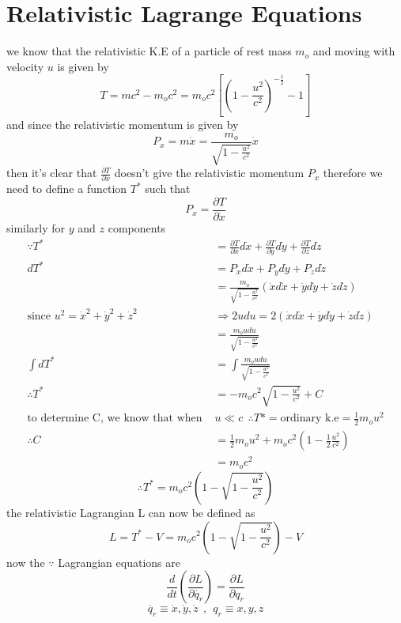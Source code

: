 \documentclass{article}
\begin{document}
\section{Relativistic Lagrange Equations}
we know that the relativistic K.E of a particle of rest mass $m_o$ and moving with velocity $u$ is given by 
\[
    T = mc^2 - m_o c^2 = m_o c^2 \left[{\left(1- \frac{u^2}{c^2}\right)}^{-\frac{1}{2}}-1\right]    
\]
and since the relativistic momentum is given by 
\[
   P_x = m \dot{x} = \frac{m_o}{\sqrt{1 - \frac{u^2}{c^2}}} \dot{x}
\]
then it's clear that $\frac{\partial T}{\partial \dot{x} }$ doesn't give the relativistic momentum $P_x$ therefore we need to define a function $T^*$ such that 
\[
    P_x = \frac{\partial T}{\partial \dot{x}}
\]
similarly for $y$ and $z$ components
\begin{align*}
    \because T^* &= \frac{\partial T}{\partial \dot{x}} d\dot{x} + \frac{\partial T}{\partial \dot{y}} d\dot{y} + \frac{\partial T}{\partial \dot{z}} d\dot{z}\\
    dT^* &= P_x d\dot{x} + P_y d\dot{y} +P_z d\dot{z}\\
    &=\frac{m_o}{\sqrt{1 - \frac{u^2}{c^2}}} \left( \dot{x}d\dot{x} + \dot{y}d\dot{y} + \dot{z}d\dot{z}  \right)\\
 \text{since } u^2 = \dot{x}^2 + \dot{y}^2 + \dot{z}^2 &\Longrightarrow 2u du =2 \left( \dot{x}d\dot{x} + \dot{y}d\dot{y} + \dot{z}d\dot{z}  \right) \\
    &=\frac{m_o u du}{\sqrt{1 - \frac{u^2}{c^2}}} \\
    \int dT^* &= \int \frac{m_o u du}{\sqrt{1 - \frac{u^2}{c^2}}} \\
\therefore T^* &= - m_o c^2\sqrt{1 - \frac{u^2}{c^2}} + C\\
\text{to determine C, we know that when }& u \ll c  \ \ \therefore T* = \text{ordinary k.e} = \frac{1}{2} m_o u^2\\
\therefore C &= \frac{1}{2} m_o u^2 + m_o c^2 \left(1- \frac{1}{2}\frac{u^2}{c^2}\right)\\
             &= m_o c^2
\end{align*}
\[
\therefore T^* = m_o c^2\left(1- \sqrt{1 - \frac{u^2}{c^2}}\right)
\]
the relativistic Lagrangian L can now be defined as 
\[
L = T^* - V = m_o c^2\left(1- \sqrt{1 - \frac{u^2}{c^2}}\right) - V
\]
now the $\because$ Lagrangian equations are
\[
\frac{d}{dt}\left( \frac{\partial L}{\partial \dot{q_r}} \right) = \frac{\partial L}{\partial q_r}
\]
\[
    \dot{q_r} \equiv  \dot{x} , \dot{y}  , \dot{z}
    \ \ , \ \ 
    q_r \equiv x , y , z
\]
\end{document}
